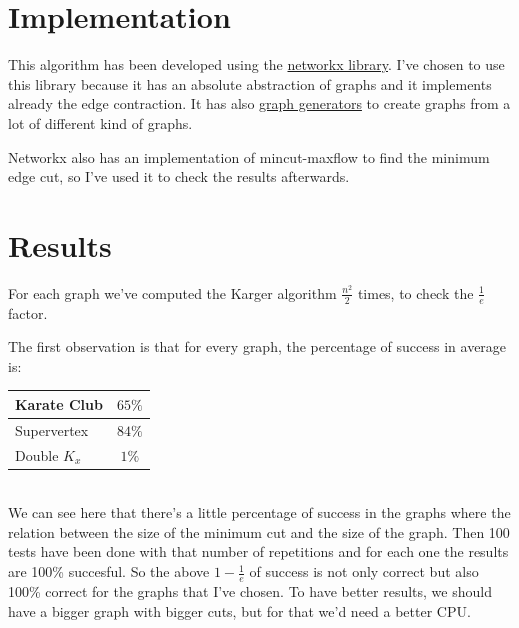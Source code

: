 \documentclass[a4paper,10pt]{article}
\begin{document}
\section{Implementation}

This algorithm has been developed using the \href{https://networkx.github.io}{networkx library}.
I've chosen to use this library because it has an absolute abstraction of graphs and it implements already
the edge contraction. It has also \href{https://networkx.github.io/documentation/stable/reference/generators.html}{graph generators} to
create graphs from a lot of different kind of graphs.

Networkx also has an implementation of mincut-maxflow to find the minimum edge cut, so I've used it to check the results afterwards.

\section{Results}

For each graph we've computed the Karger algorithm $\frac{n^2}{2}$ times, to check the $\frac{1}{e}$ factor.

The first observation is that for every graph, the percentage of success in average is:
\\

\begin{tabular}{ | l | c | }
  \hline
  Karate Club & $65\%$ \\
\hline
  Supervertex & $84\%$ \\
  \hline
  Double $K_x$ & $1\%$ \\
  \hline
\end{tabular}
\\

We can see here that there's a little percentage of success in the graphs where the relation between
the size of the minimum cut and the size of the graph.
Then 100 tests have been done with that number of repetitions and for each one the results are 100\% succesful.
So the above $1-\frac{1}{e}$ of success is not only correct but also 100\% correct for the graphs
that I've chosen.
To have better results, we should have a bigger graph with bigger cuts, but for that
we'd need a better CPU.
\end{document}
